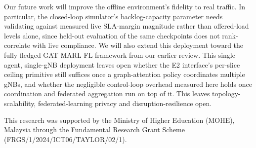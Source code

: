 \documentclass[10pt]{article}
\begin{document}
Our future work will improve the offline environment's fidelity to
real traffic. In particular, the closed-loop simulator's
backlog-capacity parameter needs validating against measured live
SLA-margin magnitude rather than offered-load levels alone, since
held-out evaluation of the same checkpoints does not rank-correlate
with live compliance. We will also extend this deployment toward the
fully-fledged GAT-MARL-FL framework from our earlier review. This
single-agent, single-gNB deployment leaves open whether the E2
interface's per-slice ceiling primitive still suffices once a
graph-attention policy coordinates multiple gNBs, and whether the
negligible control-loop overhead measured here holds once
coordination and federated aggregation run on top of it. This leaves
topology-scalability, federated-learning privacy and
disruption-resilience open.

This research was supported by the Ministry of Higher Education
(MOHE), Malaysia through the Fundamental Research Grant Scheme
(FRGS/1/2024/ICT06/TAYLOR/02/1).

\enlargethispage{4\baselineskip}


\end{document}

